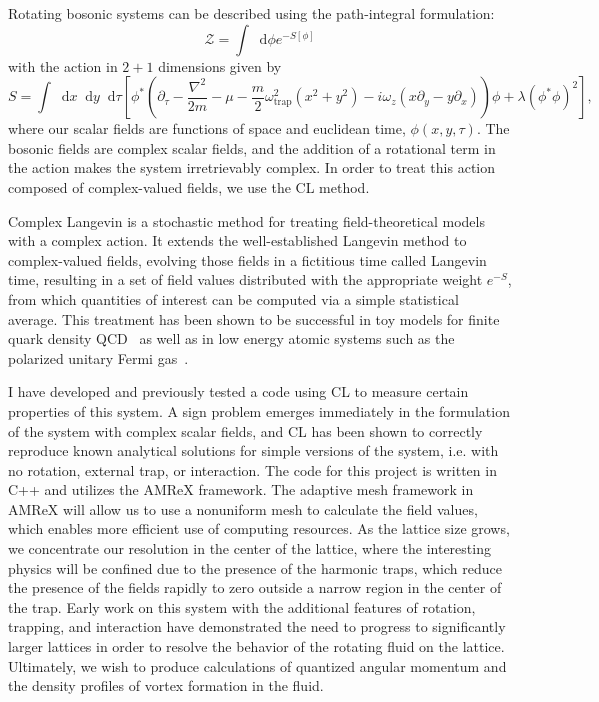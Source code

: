 \documentclass[onecolumn, 12pt]{article}
\newcommand{\beq}{\begin{equation}}
\newcommand{\eeq}{\end{equation}}
\def\CZ{{\mathcal Z}}
\def\del{{\nabla}}
\newcommand*\dif{\mathop{}\!\mathrm{d}}
\begin{document}
Rotating bosonic systems can be described using the path-integral formulation:
%
\beq
\CZ = \int \dif \phi e^{-S[\phi]}
\eeq
%
with the action in $2+1$ dimensions given by
%
\beq
S = \int \dif x \dif y \dif\tau \left[ \phi^{*}\left( \partial_{\tau} - \frac{\del^{2}}{2m} - \mu  - \frac{m}{2} \omega_{\text{trap}}^{2}(x^{2}+y^{2})- i \omega_{z}(x \partial_{y} - y\partial_{x})\right)\phi + \lambda (\phi^{*} \phi)^{2}\right],
\eeq 
%
where our scalar fields are functions of space and euclidean time, $\phi(x,y,\tau)$. The bosonic fields are complex scalar fields, and the addition of a rotational term in the action makes the system irretrievably complex. In order to treat this action composed of complex-valued fields, we use the CL method.

Complex Langevin is a stochastic method for treating field-theoretical models with a complex action. It extends the well-established Langevin method to complex-valued fields, evolving those fields in a fictitious time called Langevin time, resulting in a set of field values distributed with the appropriate weight $e^{-S}$, from which quantities of interest can be computed via a simple statistical average. This treatment has been shown to be successful in toy models for finite quark density QCD~\cite{BergerCLReview} as well as in low energy atomic systems such as the polarized unitary Fermi gas~\cite{BergerCLReview}. 

I have developed and previously tested a code using CL to measure certain properties of this system. A sign problem emerges immediately in the formulation of the system with complex scalar fields, and CL has been shown to correctly reproduce known analytical solutions for simple versions of the system, i.e. with no rotation, external trap, or interaction. The code for this project is written in C++ and utilizes the AMReX framework. The adaptive mesh framework in AMReX will allow us to use a nonuniform mesh to calculate the field values, which enables more efficient use of computing resources. As the lattice size grows, we concentrate our resolution in the center of the lattice, where the interesting physics will be confined due to the presence of the harmonic traps, which reduce the presence of the fields rapidly to zero outside a narrow region in the center of the trap. Early work on this system with the additional features of rotation, trapping, and interaction have demonstrated the need to progress to significantly larger lattices in order to resolve the behavior of the rotating fluid on the lattice. Ultimately, we wish to produce calculations of quantized angular momentum and the density profiles of vortex formation in the fluid. 
\end{document}
